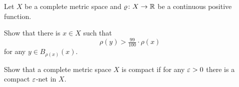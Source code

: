 \begin{pr}\label{pr:almost-min}
Let $X$ be a complete metric space and $\varrho\colon X\to \mathbb{R}$ be a continuous positive function.

Show that there is $x\in X$ such that
$$\rho(y)>\tfrac{99}{100}\cdot\rho(x)$$ 
for any $y\in B_{\rho(x)}(x)$.
\end{pr}

\begin{pr}\label{pr:compact-net}
Show that a complete metric space $X$ is compact if for any $\varepsilon>0$ there is a compact $\varepsilon$-net in $X$.  
\end{pr}


